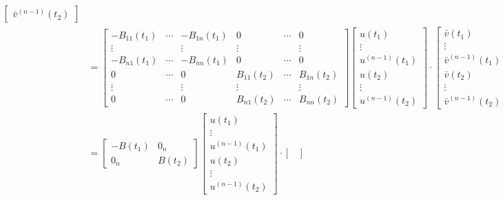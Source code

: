 \documentclass[10.5pt, oneside, a4paper]{article}
\begin{document}
\begin{rmk}
{\begin{equation}
\begin{split}
\begin{bmatrix}
            \bar{v}^{(n-1)}(t_2)
        \end{bmatrix}\\
        &= \begin{bmatrix}
            -B_{11}(t_1) & \cdots & -B_{1n}(t_1) & 0 & \cdots & 0\\
            \vdots &  & \vdots & \vdots &  & \vdots\\
            -B_{n1}(t_1) & \cdots & -B_{nn}(t_1) & 0 & \cdots & 0\\
            0 & \cdots & 0 & B_{11}(t_2) & \cdots & B_{1n}(t_2)\\
            \vdots &  & \vdots & \vdots &  & \vdots\\
            0 & \cdots & 0 & B_{n1}(t_2) & \cdots & B_{nn}(t_2)
        \end{bmatrix} 
        \begin{bmatrix}
            u(t_1)\\
            \vdots\\
            u^{(n-1)}(t_1)\\
            u(t_2)\\
            \vdots\\
            u^{(n-1)}(t_2)
        \end{bmatrix}\cdot
        \begin{bmatrix}
            \bar{v}(t_1)\\
            \vdots\\
            \bar{v}^{(n-1)}(t_1)\\
            \bar{v}(t_2)\\
            \vdots\\
            \bar{v}^{(n-1)}(t_2)
        \end{bmatrix}\\
        &= \begin{bmatrix}
            -B(t_1) & 0_n\\
            0_n & B(t_2)
        \end{bmatrix}
        \begin{bmatrix}
            u(t_1)\\
            \vdots\\
            u^{(n-1)}(t_1)\\
            u(t_2)\\
            \vdots\\
            u^{(n-1)}(t_2)
        \end{bmatrix}\cdot
        \begin{bmatrix}

\end{bmatrix}
\end{split}
\end{equation}}
\end{rmk}
\end{document}
